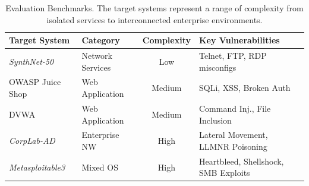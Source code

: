 
\begin{table}[htbp]
  \centering
  \caption{Evaluation Benchmarks. The target systems represent a range of complexity from isolated services to interconnected enterprise environments.}
  \label{tab:benchmarks}
  \begin{tabular}{llcl}
    \toprule
    \textbf{Target System} & \textbf{Category} & \textbf{Complexity} & \textbf{Key Vulnerabilities} \\
    \midrule
    \textit{SynthNet-50} & Network Services & Low & Telnet, FTP, RDP misconfigs \\
    OWASP Juice Shop & Web Application & Medium & SQLi, XSS, Broken Auth \\
    DVWA & Web Application & Medium & Command Inj., File Inclusion \\
    \textit{CorpLab-AD} & Enterprise NW & High & Lateral Movement, LLMNR Poisoning \\
    \textit{Metasploitable3} & Mixed OS & High & Heartbleed, Shellshock, SMB Exploits \\
    \bottomrule
  \end{tabular}
\end{table}
